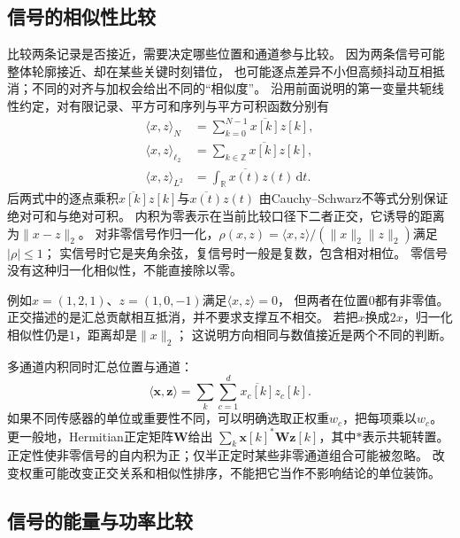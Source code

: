 \subsection{信号的相似性比较}

比较两条记录是否接近，需要决定哪些位置和通道参与比较。
因为两条信号可能整体轮廓接近、却在某些关键时刻错位，
也可能逐点差异不小但高频抖动互相抵消；不同的对齐与加权会给出不同的“相似度”。
沿用前面说明的第一变量共轭线性约定，对有限记录、平方可和序列与平方可积函数分别有
\begin{equation}
  \begin{aligned}
    \langle x,z\rangle_N&=\sum_{k=0}^{N-1}\overline{x[k]}z[k],\\
    \langle x,z\rangle_{\ell_2}&=\sum_{k\in\mathbb Z}\overline{x[k]}z[k],\\
    \langle x,z\rangle_{L^2}&=\int_{\mathbb R}\overline{x(t)}z(t)\,\mathrm dt.
  \end{aligned}
  \label{eq:signal-inner-products}
\end{equation}
后两式中的逐点乘积$\overline{x[k]}z[k]$与$\overline{x(t)}z(t)$
由Cauchy--Schwarz不等式分别保证绝对可和与绝对可积。
内积为零表示在当前比较口径下二者正交，它诱导的距离为$\|x-z\|_2$。
对非零信号作归一化，$\rho(x,z)=\langle x,z\rangle/(\|x\|_2\|z\|_2)$满足$|\rho|\leq1$；
实信号时它是夹角余弦，复信号时一般是复数，包含相对相位。
零信号没有这种归一化相似性，不能直接除以零。

例如$x=(1,2,1)$、$z=(1,0,-1)$满足$\langle x,z\rangle=0$，
但两者在位置$0$都有非零值。正交描述的是汇总贡献相互抵消，并不要求支撑互不相交。
若把$x$换成$2x$，归一化相似性仍是$1$，距离却是$\|x\|_2$；
这说明方向相同与数值接近是两个不同的判断。

多通道内积同时汇总位置与通道：
\[
  \langle\bm x,\bm z\rangle
  =\sum_k\sum_{c=1}^d \overline{x_c[k]}z_c[k].
\]
如果不同传感器的单位或重要性不同，可以明确选取正权重$w_c$，把每项乘以$w_c$。
更一般地，Hermitian正定矩阵$\bm W$给出
$\sum_k\bm x[k]^*\bm W\bm z[k]$，其中$*$表示共轭转置。
正定性使非零信号的自内积为正；仅半正定时某些非零通道组合可能被忽略。
改变权重可能改变正交关系和相似性排序，不能把它当作不影响结论的单位装饰。

\subsection{信号的能量与功率比较}

